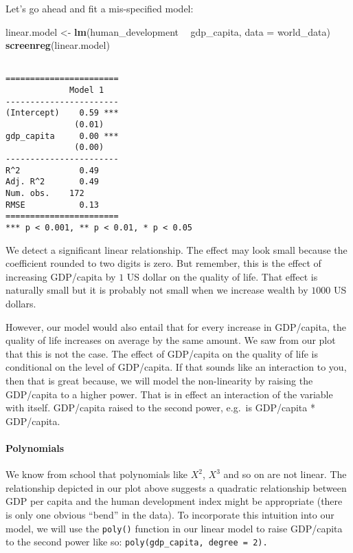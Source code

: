 \documentclass[]{article}
\newenvironment{Shaded}{\begin{snugshade}}{\end{snugshade}}
\newcommand{\DataTypeTok}[1]{\textcolor[rgb]{0.13,0.29,0.53}{#1}}
\newcommand{\KeywordTok}[1]{\textcolor[rgb]{0.13,0.29,0.53}{\textbf{#1}}}
\newcommand{\NormalTok}[1]{#1}
\newcommand{\OperatorTok}[1]{\textcolor[rgb]{0.81,0.36,0.00}{\textbf{#1}}}
\newcommand{\StringTok}[1]{\textcolor[rgb]{0.31,0.60,0.02}{#1}}
\let\oldparagraph\paragraph
\renewcommand{\paragraph}[1]{\oldparagraph{#1}\mbox{}}
\begin{document}
Let's go ahead and fit a mis-specified model:

\begin{Shaded}
\begin{Highlighting}[]
\NormalTok{linear.model <-}\StringTok{ }\KeywordTok{lm}\NormalTok{(human_development }\OperatorTok{~}\StringTok{ }\NormalTok{gdp_capita, }\DataTypeTok{data =}\NormalTok{ world_data)}
\KeywordTok{screenreg}\NormalTok{(linear.model)}
\end{Highlighting}
\end{Shaded}

\begin{verbatim}

=======================
             Model 1   
-----------------------
(Intercept)    0.59 ***
              (0.01)   
gdp_capita     0.00 ***
              (0.00)   
-----------------------
R^2            0.49    
Adj. R^2       0.49    
Num. obs.    172       
RMSE           0.13    
=======================
*** p < 0.001, ** p < 0.01, * p < 0.05
\end{verbatim}

We detect a significant linear relationship. The effect may look small because the coefficient rounded to two digits is zero. But remember, this is the effect of increasing GDP/capita by \(1\) US dollar on the quality of life. That effect is naturally small but it is probably not small when we increase wealth by \(1000\) US dollars.

However, our model would also entail that for every increase in GDP/capita, the quality of life increases on average by the same amount. We saw from our plot that this is not the case. The effect of GDP/capita on the quality of life is conditional on the level of GDP/capita. If that sounds like an interaction to you, then that is great because, we will model the non-linearity by raising the GDP/capita to a higher power. That is in effect an interaction of the variable with itself. GDP/capita raised to the second power, e.g.~is GDP/capita * GDP/capita.

\hypertarget{polynomials}{%
\paragraph{Polynomials}\label{polynomials}}

We know from school that polynomials like \(X^2\), \(X^3\) and so on are not linear. The relationship depicted in our plot above suggests a quadratic relationship between GDP per capita and the human development index might be appropriate (there is only one obvious ``bend'' in the data). To incorporate this intuition into our model, we will use the \texttt{poly()} function in our linear model to raise GDP/capita to the second power like so: \texttt{poly(gdp\_capita,\ degree\ =\ 2).}
\end{document}
